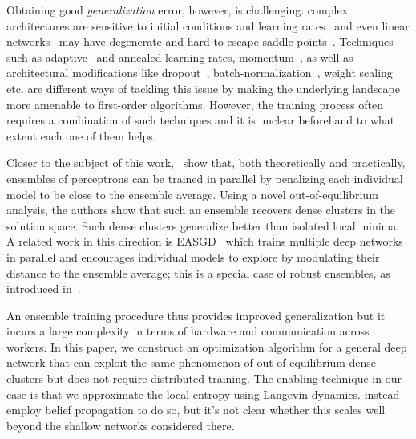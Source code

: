 \documentclass[10pt]{article}
\begin{document}
Obtaining good \emph{generalization} error, however, is challenging: complex architectures are sensitive to initial conditions and learning rates~\citep{sutskever2013importance} and even linear networks~\citep{kawaguchi2016deep} may have degenerate and hard to escape saddle points~\citep{ge2015escaping,anandkumar2016efficient}. Techniques such as adaptive~\citep{duchi2011adaptive} and annealed learning rates, momentum~\citep{tieleman2012lecture}, as well as architectural modifications like dropout~\citep{srivastava2014dropout}, batch-normalization~\citep{ioffe2015batch,cooijmans2016recurrent}, weight scaling~\citep{salimans2016weight} etc. are different ways of tackling this issue by making the underlying landscape more amenable to first-order algorithms. However, the training process often requires a combination of such techniques and it is unclear beforehand to what extent each one of them helps.

Closer to the subject of this work,~\citet{baldassi2015subdominant,baldassi2016unreasonable} show that, both theoretically and practically, ensembles of perceptrons can be trained in parallel by penalizing each individual model to be close to the ensemble average. Using a novel out-of-equilibrium analysis, the authors show that such an ensemble recovers dense clusters in the solution space. Such dense clusters generalize better than isolated local minima. A related work in this direction is EASGD~\citep{zhang2015deep} which trains multiple deep networks in parallel and encourages individual models to explore by modulating their distance to the ensemble average; this is a special case of robust ensembles, as introduced in~\citet{baldassi2016unreasonable}.

An ensemble training procedure thus provides improved generalization but it incurs a large complexity in terms of hardware and communication across workers. In this paper, we construct an optimization algorithm for a general deep network that can exploit the same phenomenon of out-of-equilibrium dense clusters but does not require distributed training. The enabling technique in our case is that we approximate the local entropy using Langevin dynamics. \citet{baldassi2016local} instead employ belief propagation to do so, but it's not clear whether this scales well beyond the shallow networks considered there.
\end{document}

